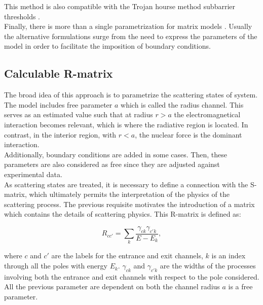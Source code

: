 \documentclass[openany]{book}
\begin{document}
This method is also compatible with the Trojan hourse method subbarrier thresholds \cite{mukhamedzhanov_shubhchintak_bertulani_2017}. \\

Finally, there is more than a single parametrization for matrix models \cite{brune_2002}. Usually the alternative formulations surge from the need to express the parameters of the model in order to facilitate the imposition of boundary conditions.  

\subsection{Calculable R-matrix} \label{sub:rmatrix_calculable}

The broad idea of this approach is to parametrize the scattering states of system.  The model includes free parameter $a$ which is called the radius channel. This serves as an estimated value such that at radius $r > a$ the electromagnetical interaction becomes relevant, which is where the radiative region is located. In contrast, in the interior region, with $r < a$, the nuclear force is the dominant interaction. \\

Additionally, boundary conditions are added in some cases. Then, these parameters are also considered as free since they are adjusted against experimental data. \\

As scattering states are treated, it is necessary to define a connection with the S-matrix, which ultimately permits the interpretation of the physics of the scattering process. The previous requisite motivates the introduction of a matrix which contains the details of scattering physics. This R-matrix is defined as:

\begin{equation}  \label{eq:rmatrix_elements}
	R_{cc'} = \sum_k {\frac{\gamma_{ck} \gamma_{c'k}}{E - E_k}}, 
\end{equation}

where $c$ and $c'$ are the labels for the entrance and exit channels, $k$ is an index through all the poles with energy $E_k$. $\gamma_{ck}$ and $\gamma_{c'k}$ are the widths of the processes involving both the entrance and exit channels with respect to the pole considered. \\

All the previous parameter are dependent on both the channel radius  $a$ is a free parameter.  \\
\end{document}
